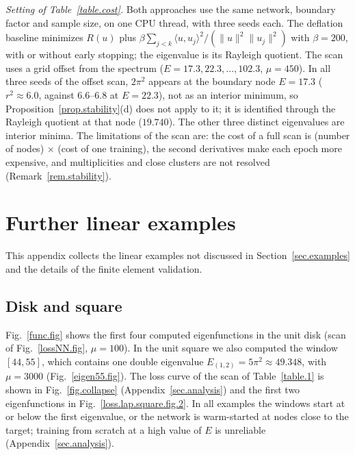\documentclass[10pt]{amsart}
\theoremstyle{definition}
\theoremstyle{remark}
\theoremstyle{plain}
\begin{document}
\emph{Setting of Table~\ref{table.cost}.} Both approaches use the same network, boundary factor and
sample size, on one CPU thread, with three seeds each. The deflation baseline minimizes $R(u)$ plus
$\beta\sum_{j<k}\langle u,u_j\rangle^2/(\|u\|^2\|u_j\|^2)$ with $\beta=200$, with or without early
stopping; the eigenvalue is its Rayleigh quotient. The scan uses a grid offset from the spectrum
($E=17.3,22.3,\dots,102.3$, $\mu=450$). In all three seeds of the offset scan, $2\pi^2$ appears at the
boundary node $E=17.3$ ($r^2\approx6.0$, against $6.6$--$6.8$ at $E=22.3$), not as an interior minimum, so
Proposition~\ref{prop.stability}(d) does not apply to it; it is identified through the Rayleigh quotient
at that node ($19.740$). The other three distinct eigenvalues are interior minima. The limitations of the
scan are: the cost of a full scan is (number of nodes) $\times$ (cost of one training), the second
derivatives make each epoch more expensive, and multiplicities and close clusters are not resolved
(Remark~\ref{rem.stability}).

\section{Further linear examples}\label{app.linear}
This appendix collects the linear examples not discussed in Section~\ref{sec.examples} and the details of the finite element validation.

\subsection{Disk and square}
Fig.~\ref{func.fig} shows the first four computed eigenfunctions in the unit disk (scan of
Fig.~\ref{lossNN.fig}, $\mu=100$). In the unit square we also computed the window $[44,55]$, which
contains one double eigenvalue $E_{(1,2)}=5\pi^2\approx49.348$, with $\mu=3000$ (Fig.~\ref{eigen55.fig}).
The loss curve of the scan of Table~\ref{table.1} is shown in Fig.~\ref{fig.collapse}
(Appendix~\ref{sec.analysis}) and the first two eigenfunctions in Fig.~\ref{loss.lap.square.fig.2}.
In all examples the windows start at or below the first eigenvalue, or the network is warm-started at
nodes close to the target; training from scratch at a high value of $E$ is unreliable
(Appendix~\ref{sec.analysis}).
\end{document}
